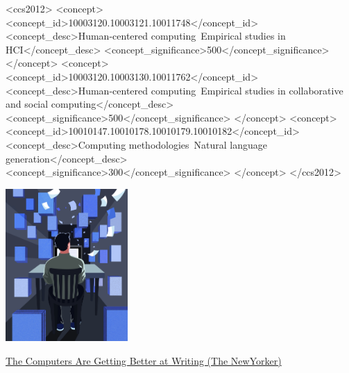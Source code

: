 \documentclass[manuscript,screen,review]{acmart}
\begin{document}

\begin{CCSXML}
<ccs2012>
   <concept>
       <concept_id>10003120.10003121.10011748</concept_id>
       <concept_desc>Human-centered computing~Empirical studies in HCI</concept_desc>
       <concept_significance>500</concept_significance>
       </concept>
   <concept>
       <concept_id>10003120.10003130.10011762</concept_id>
       <concept_desc>Human-centered computing~Empirical studies in collaborative and social computing</concept_desc>
       <concept_significance>500</concept_significance>
       </concept>
   <concept>
       <concept_id>10010147.10010178.10010179.10010182</concept_id>
       <concept_desc>Computing methodologies~Natural language generation</concept_desc>
       <concept_significance>300</concept_significance>
       </concept>
 </ccs2012>
\end{CCSXML}



\begin{teaserfigure}
    \small
    \centering
  \includegraphics[width=0.35\textwidth]{sample-ai}
  \caption{\href{https://www.newyorker.com/culture/cultural-comment/the-computers-are-getting-better-at-writing}{The Computers Are Getting Better at Writing (The NewYorker)}}
  \label{fig:teaser}
\end{teaserfigure}
\end{document}

